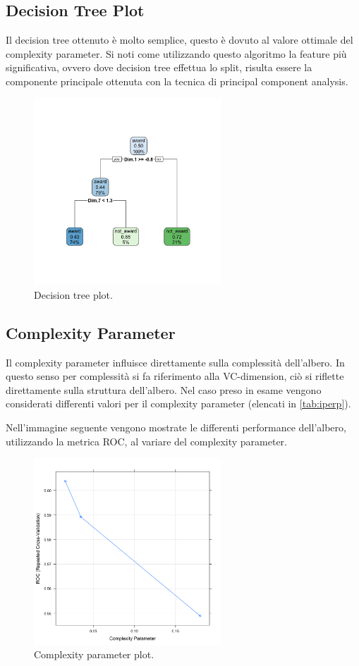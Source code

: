 \subsection{Decision Tree Plot}
Il decision tree ottenuto è molto semplice, questo è dovuto al valore
ottimale del complexity parameter. Si noti come utilizzando questo algoritmo
la feature più significativa, ovvero dove decision tree effettua lo split, risulta
essere la componente principale ottenuta con la tecnica di principal
component analysis.


\begin{figure}[H]
	\centering
	\includegraphics[width=7cm,trim={2.5cm 2.5cm 2.5cm 2.5cm}, clip]{../images/rpart_plot.png}
	\caption{Decision tree plot.}
	\label{fig:decision_tree_plot}
\end{figure}

\subsection{Complexity Parameter}
Il complexity parameter influisce direttamente sulla complessità
dell'albero. In questo senso per complessità si fa riferimento alla
VC-dimension, ciò si riflette direttamente sulla struttura
dell'albero. Nel caso preso in esame vengono considerati differenti
valori per il complexity parameter (elencati in \autoref{tab:iperp}).

Nell'immagine seguente vengono mostrate le differenti performance
dell'albero, utilizzando la metrica ROC, al variare del complexity
parameter.
\begin{figure}[H]
	\centering
	\includegraphics[width=7cm]{../images/rpart_cp_plot.png}
	\caption{Complexity parameter plot.}
	\label{fig:cp_plot}
\end{figure}


